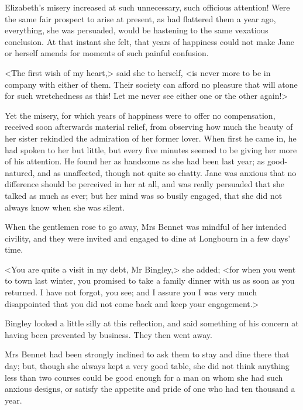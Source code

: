 Elizabeth's misery increased at such unnecessary, such officious attention! Were the same fair prospect to arise at present, as had flattered them a year ago, everything, she was persuaded, would be hastening to the same vexatious conclusion. At that instant she felt, that years of happiness could not make Jane or herself amends for moments of such painful confusion.

<The first wish of my heart,> said she to herself, <is never more to be in company with either of them. Their society can afford no pleasure that will atone for such wretchedness as this! Let me never see either one or the other again!>

Yet the misery, for which years of happiness were to offer no compensation, received soon afterwards material relief, from observing how much the beauty of her sister rekindled the admiration of her former lover. When first he came in, he had spoken to her but little, but every five minutes seemed to be giving her more of his attention. He found her as handsome as she had been last year; as good-natured, and as unaffected, though not quite so chatty. Jane was anxious that no difference should be perceived in her at all, and was really persuaded that she talked as much as ever; but her mind was so busily engaged, that she did not always know when she was silent.

When the gentlemen rose to go away, Mrs Bennet was mindful of her intended civility, and they were invited and engaged to dine at Longbourn in a few days' time.

<You are quite a visit in my debt, Mr Bingley,> she added; <for when you went to town last winter, you promised to take a family dinner with us as soon as you returned. I have not forgot, you see; and I assure you I was very much disappointed that you did not come back and keep your engagement.>

Bingley looked a little silly at this reflection, and said something of his concern at having been prevented by business. They then went away.

Mrs Bennet had been strongly inclined to ask them to stay and dine there that day; but, though she always kept a very good table, she did not think anything less than two courses could be good enough for a man on whom she had such anxious designs, or satisfy the appetite and pride of one who had ten thousand a year.